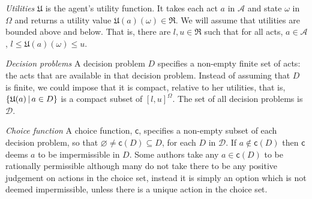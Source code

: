 \documentclass[a4paper]{article}
\newcommand\A{\mathcal{A}}
\newcommand\D{\mathcal{D}}
\renewcommand\S{\mathcal{S}}
\renewcommand\P{\mathbb{P}} %
\renewcommand\c{\mathsf{c}} %
\newcommand\EU{\mathrm{EU}}
\newcommand\REU{\mathrm{REU}}
\newcommand\EAd{\mathrm{EAd}}
\newcommand\U{\mathfrak{U}} %
\newcommand\Maximin{\Gamma}
\newcommand{\IP}{\P}
\renewcommand{\color}[1]{}
\newcommand\SetDelimiter[1][]{
	\nonscript\,#1\vert \allowbreak \nonscript\,\mathopen{}}
\providecommand\given{\SetDelimiter}
\renewcommand{\emptyset}{\varnothing}
\renewcommand{\leq}{\leqslant}
\newenvironment{CCM rewritten}
{\begingroup\color{blue}} %
{\endgroup}              %
\begin{document}
 \emph{Utilities } $\U$ is the agent's utility function. It takes each act $a$ in $\A$ and state $\omega$ in $\Omega$ and returns a utility value $\U(a)(\omega)\in\Re$. We will assume that utilities are bounded above and below. That is, there are $l,u\in\Re$ such that for all acts, $a\in\A$, $l\leq \U(a)(\omega)\leq u$. 

\emph{Decision problems } A decision problem $D$ specifies a non-empty finite set of acts: the acts that are available in that decision problem. 
Instead of assuming that $D$ is finite, we could impose that it is compact, relative to her utilities, that is, $\{\U(a)\given a \in D\}$ is a compact subset of $[l,u]^\Omega$. 
The set of all decision problems is $\D$. 



{\color{violet}
\emph{Choice function } A choice function, $\c$, specifies a non-empty subset of each decision problem, so that $\emptyset \neq \c(D) \subseteq D$, for each $D$ in $\D$. If $a\notin\c(D)$ then $\c$ deems $a$ to be impermissible in $D$. Some authors take any $a\in\c(D)$ to be rationally permissible \citep[e.g.,][]{moss2015tse}  although many do not take there to be any positive judgement on actions in the choice set, instead it is simply an option which is not deemed impermissible, unless there is a unique action in the choice set. 
}
\end{document}
